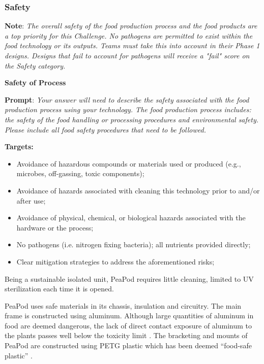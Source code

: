 \documentclass{report}
\begin{document}
\newpage

\subsubsection{Safety}
\label{sec:safety}

\textbf{Note}: \textit{The overall safety of the food production process and the food products are a top priority for this Challenge. No pathogens are permitted to exist within the food technology or its outputs.  Teams must take this into account in their Phase 1 designs. Designs that fail to account for pathogens will receive a "fail" score on the Safety category.}

\textbf{Safety of Process}
\label{sec:safety-process}

\textbf{Prompt}: \textit{Your answer will need to describe the safety associated with the food production process using your technology. The food production process includes: the safety of the food handling or processing procedures and environmental safety. Please include all food safety procedures that need to be followed.}

\textbf{Targets:}
\begin{itemize}
    \item Avoidance of hazardous compounds or materials used or produced (e.g., microbes, off-gassing, toxic components);
    \item Avoidance of hazards associated with cleaning this technology prior to and/or after use;
    \item Avoidance of physical, chemical, or biological hazards associated with the hardware or the process;
    \item No pathogens (i.e. nitrogen fixing bacteria); all nutrients provided directly;
    \item Clear mitigation strategies to address the aforementioned risks;
\end{itemize}


Being a sustainable isolated unit, PeaPod requires little cleaning, limited to UV sterilization each time it is opened.

PeaPod uses safe materials in its chassis, insulation and circuitry. 
The main frame is constructed using aluminum. Although large quantities of aluminum in food are deemed dangerous, the lack of direct contact exposure of aluminum to the plants passes well below the toxicity limit \cite{aluminum}.
The bracketing and mounts of PeaPod are constructed using PETG plastic which has been deemed “food-safe plastic” \cite{petg}.
\end{document}
